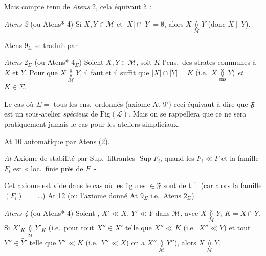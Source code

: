 \documentclass[11pt,a4paper]{article}
\begin{document}
Mais compte tenu de \emph{Atens} 2, cela équivaut à :

\emph{Atens 2} (ou Atens* 4) Si $X, Y \in \mathcal{M}$ et $|X| \cap |Y| = \emptyset$, alors $X \underset{\mathcal{M}}{\between} Y$ (donc $X \parallel Y$).


Atens $9_{\Sigma}$ se traduit par

\emph{Atens $2_{\Sigma}$} (ou Atens* $4_{\Sigma}$)  Soient $X, Y \in \mathcal{M}$,  soit $K$ l'ens.\ des strates communes à $X$ et $Y$. Pour que $X \underset{\mathcal{M}}{\between} Y$, il faut et il suffit que $|X| \cap |Y| = K$ (i.e.\ $X \underset{\mathrm{ens}}{\between} Y$) \emph{et} $K \in \Sigma$.

Le cas où $\Sigma =$ tous les ens.\ ordonnés (axiome At 9') ceci équivaut à dire que $\mathfrak{F}$ est un sous-atelier \emph{spécieux} de  $\mathrm{Fig}(\mathcal{L})$. Mais  on se rappellera que ce ne sera pratiquement jamais le cas pour les ateliers \struck{\ill{}} simpliciaux.

At 10 automatique par Atens (2).

\emph{At \struck{\ill{}}} Axiome de stabilité par Sup.\ filtrantes $\operatorname{Sup} F_i$, quand les $F_i \ll F$ et la famille $F_i$ est « loc.\ finie près de $F$ ».


Cet axiome est vide dans le cas où les figures $\in \mathfrak{F}$ sont  de t.f.\ (car alors la famille $(F_i)$ \ill{} $=$  \ldots) At 12 (ou l'axiome donné \ill{} At $9_{\Sigma}$ i.e.\ Atens $2_{\Sigma}$)

\emph{Atens 4} (ou Atens* 4) Soient , $X' \ll X$, $Y' \ll Y$ dans $\mathcal{M}$,  avec $X \underset{\mathcal{M}}{\between} Y$, $K = X \cap Y$. Si $X'_K \underset{\mathcal{M}}{\between} Y'_K$ (i.e.\ pour tout \struck{\ill{}} $X'' \in \widetilde{X'}$ telle que $X'' \ll K$ (i.e.\ $X'' \ll Y$) et tout $Y'' \in \widetilde{Y'}$ telle que $Y'' \ll K$ (i.e.\ $Y'' \ll X$) on a $X'' \underset{\mathcal{M}}{\between} Y''$), alors $X \underset{\mathcal{M}}{\between} Y$.
\end{document}
